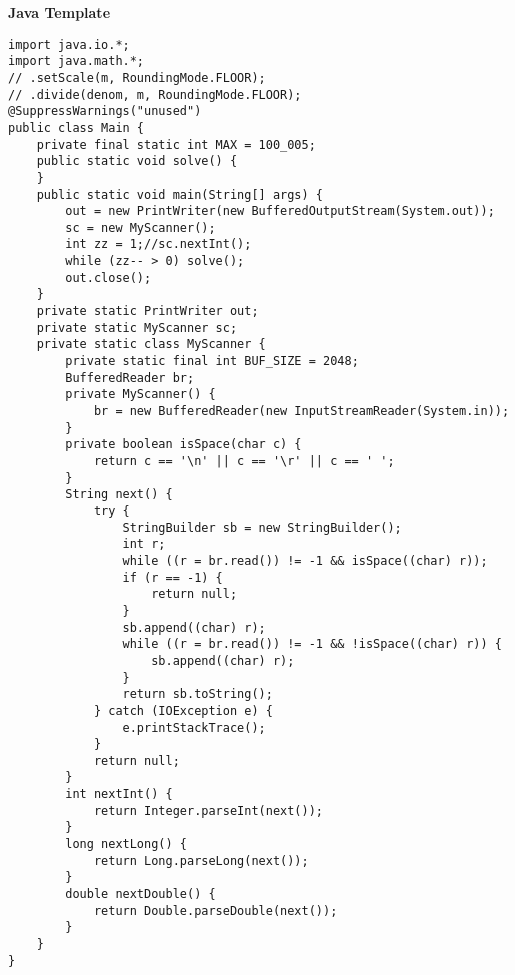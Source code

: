 \documentclass[a4paper,10pt]{article}
\newcommand{\titleAlg}[1]{\vspace{-10pt}
\begin{center}\textbf{#1}\end{center} \vspace{-10pt}}
\begin{document}
\titleAlg{Java Template}
\begin{verbatim}
import java.io.*;
import java.math.*;
// .setScale(m, RoundingMode.FLOOR);
// .divide(denom, m, RoundingMode.FLOOR);
@SuppressWarnings("unused")
public class Main {
    private final static int MAX = 100_005;
    public static void solve() {
    }
    public static void main(String[] args) {
        out = new PrintWriter(new BufferedOutputStream(System.out));
        sc = new MyScanner();
        int zz = 1;//sc.nextInt();
        while (zz-- > 0) solve();
        out.close();
    }
    private static PrintWriter out;
    private static MyScanner sc;
    private static class MyScanner {
        private static final int BUF_SIZE = 2048;
        BufferedReader br;
        private MyScanner() {
            br = new BufferedReader(new InputStreamReader(System.in));
        }
        private boolean isSpace(char c) {
            return c == '\n' || c == '\r' || c == ' ';
        }
        String next() {
            try {
                StringBuilder sb = new StringBuilder();
                int r;
                while ((r = br.read()) != -1 && isSpace((char) r));
                if (r == -1) {
                    return null;
                }
                sb.append((char) r);
                while ((r = br.read()) != -1 && !isSpace((char) r)) {
                    sb.append((char) r);
                }
                return sb.toString();
            } catch (IOException e) {
                e.printStackTrace();
            }
            return null;
        }
        int nextInt() {
            return Integer.parseInt(next());
        }
        long nextLong() {
            return Long.parseLong(next());
        }
        double nextDouble() {
            return Double.parseDouble(next());
        }
    }
}
\end{verbatim}
\end{document}
